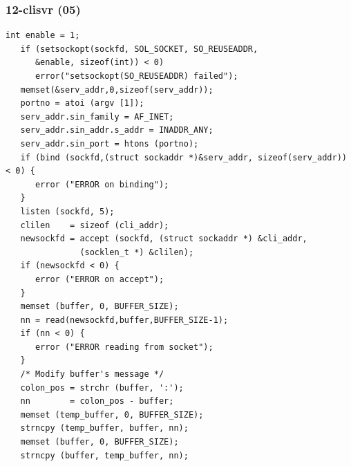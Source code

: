 \documentclass[aspectratio=169, xcolor=table, notheorems, hyperref={pdfpagelabels=false}]{beamer}
\begin{document}
\begin{frame}[fragile]
\frametitle{12-clisvr (05)}
\begin{lstlisting}[basicstyle=\ttfamily\tiny]
   int enable = 1;
   if (setsockopt(sockfd, SOL_SOCKET, SO_REUSEADDR, 
      &enable, sizeof(int)) < 0)
      error("setsockopt(SO_REUSEADDR) failed");
   memset(&serv_addr,0,sizeof(serv_addr));
   portno = atoi (argv [1]);
   serv_addr.sin_family = AF_INET;
   serv_addr.sin_addr.s_addr = INADDR_ANY;
   serv_addr.sin_port = htons (portno);
   if (bind (sockfd,(struct sockaddr *)&serv_addr, sizeof(serv_addr)) < 0) {
      error ("ERROR on binding");
   }
   listen (sockfd, 5);
   clilen    = sizeof (cli_addr);
   newsockfd = accept (sockfd, (struct sockaddr *) &cli_addr,
               (socklen_t *) &clilen);
   if (newsockfd < 0) {
      error ("ERROR on accept");
   }
   memset (buffer, 0, BUFFER_SIZE);
   nn = read(newsockfd,buffer,BUFFER_SIZE-1);
   if (nn < 0) {
      error ("ERROR reading from socket");
   }
   /* Modify buffer's message */
   colon_pos = strchr (buffer, ':');
   nn        = colon_pos - buffer;
   memset (temp_buffer, 0, BUFFER_SIZE);
   strncpy (temp_buffer, buffer, nn);
   memset (buffer, 0, BUFFER_SIZE);
   strncpy (buffer, temp_buffer, nn);

\end{lstlisting}
\end{frame}
\end{document}
